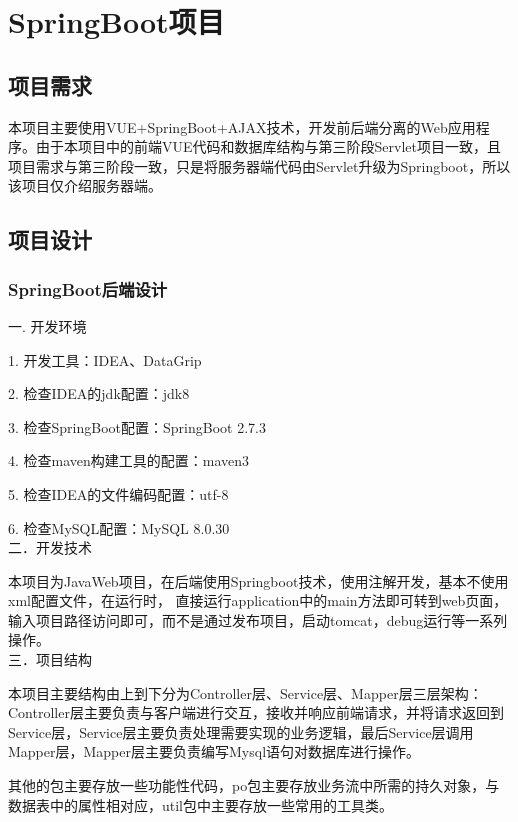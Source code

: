 
\chapter{SpringBoot项目}
\section{项目需求}
本项目主要使用VUE+SpringBoot+AJAX技术，开发前后端分离的Web应用程序。由于本项目中的前端VUE代码和数据库结构与第三阶段Servlet项目一致，且项目需求与第三阶段一致，只是将服务器端代码由Servlet升级为Springboot，所以该项目仅介绍服务器端。~\\

\section{项目设计}
\subsection{SpringBoot后端设计}

\noindent
一. 开发环境

1. 开发工具：IDEA、DataGrip

2. 检查IDEA的jdk配置：jdk8

3. 检查SpringBoot配置：SpringBoot 2.7.3

4. 检查maven构建工具的配置：maven3

5. 检查IDEA的文件编码配置：utf-8

6. 检查MySQL配置：MySQL 8.0.30~\\


\noindent
二．开发技术

本项目为JavaWeb项目，在后端使用Springboot技术，使用注解开发，基本不使用xml配置文件，在运行时， 直接运行application中的main方法即可转到web页面，输入项目路径访问即可，而不是通过发布项目，启动tomcat，debug运行等一系列操作。~\\

\noindent
三．项目结构

本项目主要结构由上到下分为Controller层、Service层、Mapper层三层架构：Controller层主要负责与客户端进行交互，接收并响应前端请求，并将请求返回到Service层，Service层主要负责处理需要实现的业务逻辑，最后Service层调用Mapper层，Mapper层主要负责编写Mysql语句对数据库进行操作。

其他的包主要存放一些功能性代码，po包主要存放业务流中所需的持久对象，与数据表中的属性相对应，util包中主要存放一些常用的工具类。


